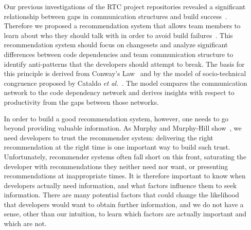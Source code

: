 Our previous investigations of the RTC project repositories revealed a significant relationship between gaps in communication structures and build success~\cite{wolf:icse:2009}. Therefore we proposed a recommendation system that allows team members to learn about who they should talk with in order to avoid build failures~\cite{schroeter:rsse:2008}. This recommendation system should focus on changesets and analyze significant differences between code dependencies and team communication structure to identify anti-patterns that the developers should attempt to break.
The basis for this principle is derived from Conway's Law~\cite{conway:datamination:1968} and by the model of socio-technical congruence proposed by Cataldo \emph{et al.}~\cite{cataldo:cscw:2006,cataldo:esem:2008}.
The model compares the communication network to the code dependency network and derives insights with respect to productivity from the gaps between those networks.
\vspace{-2pt}

In order to build a good recommendation system, however, one needs to go beyond providing valuable information. As Murphy and Murphy-Hill show~\cite{murphy:rsse:2010}, we need developers to trust the recommender system: delivering the right recommendation at the right time is one important way to build such trust. Unfortunately, recommender systems often fall short on this front, saturating the developer with recommendations they neither need nor want, or presenting recommendations at inappropriate times. It is therefore important to know when developers actually need information, and what factors influence them to seek information. There are many potential factors that could change the likelihood that developers would want to obtain further information, and we do not have a sense, other than our intuition, to learn which factors are actually important and which are not.
\vspace{-2pt}

